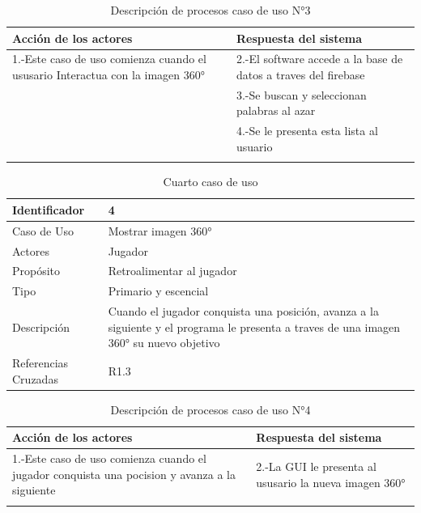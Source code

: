 \begin{longtable}[H]{| m{8cm} | m{8cm} |}
\hline 
\textbf{Acción de los actores} & \textbf{Respuesta del sistema}\\
\hline 
1.-Este caso de uso comienza cuando el ususario Interactua con la imagen 360° & 2.-El software accede a la base de datos a traves del firebase\\
\hline
& 3.-Se buscan y seleccionan palabras al azar\\
\hline
& 4.-Se le presenta esta lista al usuario\\
\hline
\caption{Descripción de procesos caso de uso N°3}
\end{longtable}

\begin{table}[H]
    \begin{center}
        \begin{tabular}{| l | m{12cm} |}        
        	\hline 
        	Identificador & 4\\
        	\hline
        	Caso de Uso & Mostrar imagen 360°\\
        	\hline
        	Actores & Jugador\\
        	\hline
        	Propósito & Retroalimentar al jugador \\
        	\hline
        	Tipo & Primario y escencial\\
        	\hline
        	Descripción & Cuando el jugador conquista una posición, avanza a la siguiente y el programa le presenta a traves de una imagen 360° su nuevo objetivo\\
        	\hline
        	Referencias Cruzadas & R1.3\\
        	\hline
        \end{tabular}
    \caption{Cuarto caso de uso}
    \label{Caso_de_uso_4}
    \end{center}
\end{table}

\begin{longtable}[H]{| m{8cm} | m{8cm} |}
\hline 
\textbf{Acción de los actores} & \textbf{Respuesta del sistema}\\
\hline 
1.-Este caso de uso comienza cuando el jugador conquista una pocision y avanza a la siguiente & 2.-La GUI le presenta al ususario la nueva imagen 360°\\
\hline 
\caption{Descripción de procesos caso de uso N°4}
\end{longtable}

